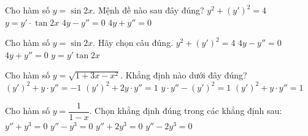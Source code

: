 

\begin{ex}%
	Cho hàm số $y=\sin 2x$. Mệnh đề nào sau đây đúng? 
	 \choice
		 {$y^2+\left(y'\right)^2=4$}
		{$y=y'\cdot\tan  2x$}
		{$4y-y''=0$} 
		 {\True $4y+y''=0$}
\end{ex}

\begin{ex}%
	 Cho hàm số $y=\sin 2x$. Hãy chọn câu đúng.
	\choice 
		 {$y^2+\left(y'\right)^2=4$}
		 {$4y-y''=0$}
		{\True $4y+y''=0$} 
		{$y=y'\tan 2x$} 
\end{ex}

\begin{ex}%
	Cho hàm số $y=\sqrt{1+3x-x^2}$.  Khẳng định nào dưới đây đúng?
	\choice 
		{\True  $\left(y'\right)^2+y\cdot y''=-1$}
		{$\left(y'\right)^2+2y\cdot y''=1$} 
		{$y\cdot y''-\left(y'\right)^2=1$} 
		 {$\left(y'\right)^2+y\cdot y''=1$}
\end{ex}

\begin{ex}%
	Cho hàm số $y = \dfrac{1}{{1 -  x}}$. Chọn khẳng định đúng trong các khẳng định sau:
	 \choice
		 {$y'' + y^3 = 0$}
		 {$y'' - y^3 = 0$}
		{$y'' +  2y^3 = 0$}
		{\True $y'' - 2y^3  = 0$}
\end{ex}


